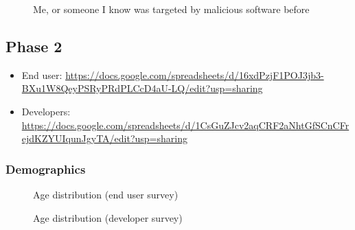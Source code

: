 \begin{figure}[H]
\centering
{}
\vspace*{-1mm}
\caption{Me, or someone I know was targeted by malicious software before}
\end{figure}


\subsection{Phase 2}

\begin{itemize}
    \item End user: \url{https://docs.google.com/spreadsheets/d/16xdPzjF1POJ3jb3-BXu1W8QeyPSRyPRdPLCcD4aU-LQ/edit?usp=sharing}
    \item Developers: \url{https://docs.google.com/spreadsheets/d/1CsGuZJcv2aqCRF2aNhtGfSCnCFrejdKZYUIqunJgyTA/edit?usp=sharing}
\end{itemize}

\subsubsection{Demographics}

\begin{figure}[H]
\centering
{}
\vspace*{-1mm}
\caption{Age distribution (end user survey)}
\end{figure}

\begin{figure}[H]
\centering
{}
\vspace*{-1mm}
\caption{Age distribution (developer survey)}
\end{figure}


